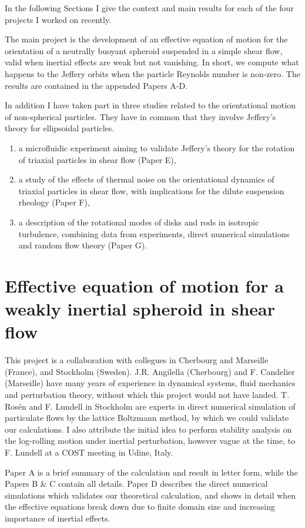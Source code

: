 \documentclass[thesis.tex]{subfiles}
\begin{document}
In the following Sections I give the context and main results for each of the four projects I worked on recently. 

The main project is the development of an effective equation of motion for the orientation of a neutrally buoyant spheroid suspended in a simple shear flow, valid when inertial effects are weak but not vanishing. In short, we compute what happens to the Jeffery orbits when the particle Reynolds number is non-zero. The results are contained in the appended Papers A-D.

In addition I have taken part in three studies related to the orientational motion of non-spherical particles. They have in common that they involve Jeffery's theory for ellipsoidal particles.
\begin{enumerate}
    \item a microfluidic experiment aiming to validate Jeffery's theory for the rotation of triaxial particles in shear flow (Paper E),
    \item a study of the effects of thermal noise on the orientational dynamics of triaxial particles in shear flow, with implications for the dilute suspension rheology (Paper F),
    \item a description of the rotational modes of disks and rods in isotropic turbulence, combining data from experiments, direct numerical simulations and random flow theory (Paper G).
\end{enumerate}


\chapter{Effective equation of motion for a weakly inertial spheroid in shear flow}\label{sec:effective}

This project is a collaboration with collegues in Cherbourg and Marseille (France), and Stockholm (Sweden). J.R. Angilella (Cherbourg) and F. Candelier (Marseille) have many years of experience in dynamical systems, fluid mechanics and perturbation theory, without which this project would not have landed. T. Ros\'en and F. Lundell in Stockholm are experts in direct numerical simulation of particulate flows by the lattice Boltzmann method, by which we could validate our calculations. I also attribute the initial idea to perform stability analysis on the log-rolling motion under inertial perturbation, however vague at the time, to F. Lundell at a COST meeting in Udine, Italy. 

Paper A is a brief summary of the calculation and result in letter form, while the Papers B \& C contain all details. Paper D describes the direct numerical simulations which validates our theoretical calculation, and shows in detail when the effective equations break down due to finite domain size and increasing importance of inertial effects.
\end{document}
